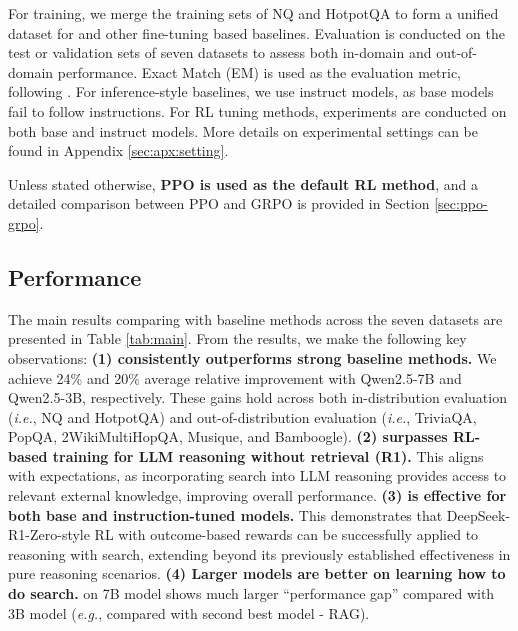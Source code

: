 For training, we merge the training sets of NQ and HotpotQA to form a unified dataset for \Ours and other fine-tuning based baselines. Evaluation is conducted on the test or validation sets of seven datasets to assess both in-domain and out-of-domain performance. Exact Match (EM) is used as the evaluation metric, following \cite{yu2024rankrag}.
For inference-style baselines, we use instruct models, as base models fail to follow instructions. For RL tuning methods, experiments are conducted on both base and instruct models. More details on experimental settings can be found in Appendix \ref{sec:apx:setting}.

Unless stated otherwise, \textbf{PPO is used as the default RL method}, and a detailed comparison between PPO and GRPO is provided in Section \ref{sec:ppo-grpo}.



\subsection{Performance}

The main results comparing \Ours with baseline methods across the seven datasets are presented in Table \ref{tab:main}. From the results, we make the following key observations:
\textbf{(1) \Ours consistently outperforms strong baseline methods.} We achieve 24\% and 20\% average relative improvement with Qwen2.5-7B and Qwen2.5-3B, respectively. These gains hold across both in-distribution evaluation (\textit{i.e.}, NQ and HotpotQA) and out-of-distribution evaluation (\textit{i.e.}, TriviaQA, PopQA, 2WikiMultiHopQA, Musique, and Bamboogle).
\textbf{(2) \Ours surpasses RL-based training for LLM reasoning without retrieval (R1).} This aligns with expectations, as incorporating search into LLM reasoning provides access to relevant external knowledge, improving overall performance.
\textbf{(3) \Ours is effective for both base and instruction-tuned models.} This demonstrates that DeepSeek-R1-Zero-style RL with outcome-based rewards \citep{guo2025deepseek} can be successfully applied to reasoning with search, extending beyond its previously established effectiveness in pure reasoning scenarios.
\textbf{(4) Larger models are better on learning how to do search.} \Ours on 7B model shows much larger ``performance gap'' compared with 3B model (\textit{e.g.}, compared with second best model - RAG).
